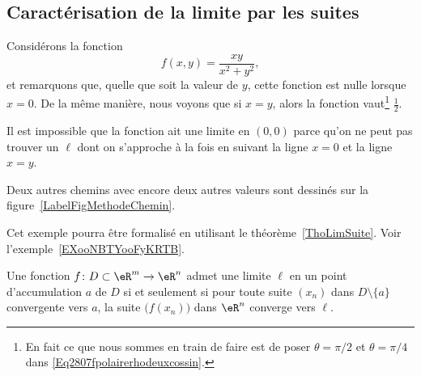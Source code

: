 \subsection{Caractérisation de la limite par les suites}

\begin{example}		\label{ExFNExempleMethodeTrigigi}
	Considérons la fonction
	\begin{equation}
		f(x,y)=\frac{ xy }{ x^2+y^2 },
	\end{equation}
	et remarquons que, quelle que soit la valeur de \( y\), cette fonction est nulle lorsque \( x=0\). De la même manière, nous voyons que si \( x=y\), alors la fonction vaut\footnote{En fait ce que nous sommes en train de faire est de poser \( \theta=\pi/2\) et \( \theta=\pi/4\) dans \eqref{Eq2807fpolairerhodeuxcossin}.} \( \frac{ 1 }{2}\).

	Il est impossible que la fonction ait une limite en \( (0,0)\) parce qu'on ne peut pas trouver un \( \ell\) dont on s'approche à la fois en suivant la ligne \( x=0\) et la ligne \( x=y\).

	Deux autres chemins avec encore deux autres valeurs sont dessinés sur la figure~\ref{LabelFigMethodeChemin}.

	Cet exemple pourra être formalisé en utilisant le théorème~\ref{ThoLimSuite}. Voir l'exemple~\ref{EXooNBTYooFyKRTB}.
\end{example}

\begin{theorem}		\label{ThoLimSuite}
	Une fonction \( f\colon D\subset\eR^m\to \eR^n\) admet une limite \( \ell\) en un point d'accumulation \( a\) de \( D\) si et seulement si pour toute suite \( (x_n)\) dans \( D\setminus\{ a \}\) convergente vers \( a\), la suite \( \big( f(x_n) \big)\) dans \( \eR^n\) converge vers \( \ell\).
\end{theorem}

